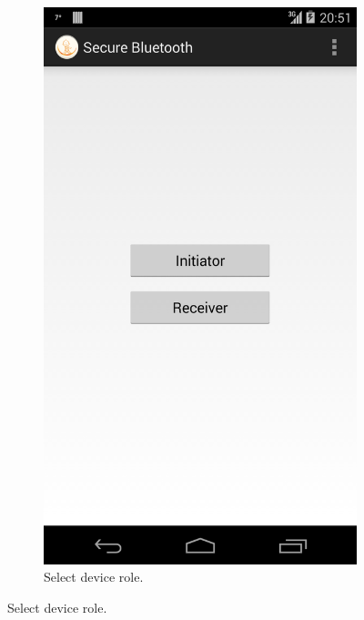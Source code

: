 \documentclass[conference, 11pt]{sty/IEEEtran}
\begin{document}
\newpage

\begin{figure}
\centering
\begin{subfigure}{0.28\textwidth}
\includegraphics[width=\textwidth]{../screenshots/Screenshot_2013-12-01-20-51-28.png}
\caption{Select device role.}
\end{subfigure}


\end{figure}
\end{document}
